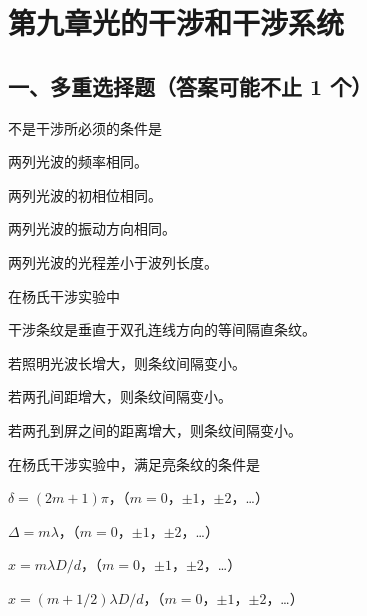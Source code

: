 \documentclass[padl, analysis, notocnum]{ExBook}
\newcommand{\answerarea}[1][3.5cm]{%
  \par\vspace{1mm}%
  \noindent{\color{themeColor!35}\rule{\linewidth}{0.4pt}}\par
  \noindent\begin{minipage}[t][#1][t]{\linewidth}\vspace{0pt}\end{minipage}\par
  \noindent{\color{themeColor!35}\rule{\linewidth}{0.4pt}}\par
}
\begin{document}
\section{第九章\quad 光的干涉和干涉系统}
\subsection{一、多重选择题（答案可能不止 1 个）}
\begin{qitems}[startnum=1]
\qitem 不是干涉所必须的条件是
\par\noindent\hspace{2em}两列光波的频率相同。
\par\noindent\hspace{2em}两列光波的初相位相同。
\par\noindent\hspace{2em}两列光波的振动方向相同。
\par\noindent\hspace{2em}两列光波的光程差小于波列长度。
\label{q:204:start}
\answerarea[4.0cm]
\label{q:204:end}
\end{qitems}

\begin{qitems}[startnum=2]
\qitem 在杨氏干涉实验中
\par\noindent\hspace{2em}干涉条纹是垂直于双孔连线方向的等间隔直条纹。
\par\noindent\hspace{2em}若照明光波长增大，则条纹间隔变小。
\par\noindent\hspace{2em}若两孔间距增大，则条纹间隔变小。
\par\noindent\hspace{2em}若两孔到屏之间的距离增大，则条纹间隔变小。
\label{q:205:start}
\answerarea[4.0cm]
\label{q:205:end}
\end{qitems}

\begin{qitems}[startnum=3]
\qitem 在杨氏干涉实验中，满足亮条纹的条件是
\par\noindent\hspace{2em}$\delta =(2m+1)\pi$，（$m=0$，$\pm 1$，$\pm 2$，…）
\par\noindent\hspace{2em}$\Delta =m\lambda$，（$m=0$，$\pm 1$，$\pm 2$，…）
\par\noindent\hspace{2em}$x=m\lambda D/d$，（$m=0$，$\pm 1$，$\pm 2$，…）
\par\noindent\hspace{2em}$x=(m+1/2)\lambda D/d$，（$m=0$，$\pm 1$，$\pm 2$，…）
\label{q:206:start}
\answerarea[4.0cm]
\label{q:206:end}
\end{qitems}
\end{document}
